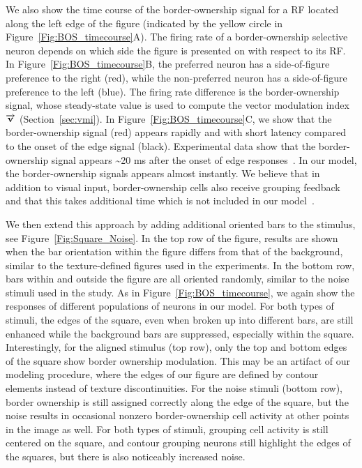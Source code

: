 We also show the time course of the border-ownership signal for a RF
located along the left edge of the figure (indicated by the yellow
circle in Figure~\ref{Fig:BOS_timecourse}A). The firing rate of a
border-ownership selective neuron depends on which side the figure is
presented on with respect to its RF. In
Figure~\ref{Fig:BOS_timecourse}B, the preferred neuron has a
side-of-figure preference to the right (red), while the non-preferred
neuron has a side-of-figure preference to the left (blue). The firing
rate difference is the border-ownership signal, whose steady-state
value is used to compute the vector modulation index 
$\overrightarrow{\mathbf{v}}$ 
(Section~\ref{sec:vmi}). In Figure~\ref{Fig:BOS_timecourse}C, we show
that the border-ownership signal (red) appears rapidly and with short
latency compared to the onset of the edge signal (black).
Experimental data show that the border-ownership signal appears 
\textasciitilde 20 ms after the onset of edge
responses~\citep{Zhou_etal00}. In our model, the
border-ownership signals appears almost instantly. We believe that in
addition to visual input, border-ownership cells also receive grouping
feedback and that this takes additional time which is not included in
our model~\citep[see][as an example of a model with
latencies]{Craft_etal07}.  

We then extend this approach by adding additional oriented bars to the
stimulus, see Figure~\ref{Fig:Square_Noise}. In the top row of the figure, results are shown when the bar
orientation within the figure differs from that of the background, 
similar to the texture-defined figures used in the
\citet{Lamme95} experiments. In the bottom row, bars within and outside the figure are all oriented
randomly, similar to the
noise stimuli used in the \citet{Chen_etal14} study.  As in
Figure~\ref{Fig:BOS_timecourse}, we again show the responses of
different populations of neurons in our model.  For both types of
stimuli, the edges of the square, even when broken up into different
bars, are still enhanced while the background bars are suppressed,
especially within the square.  Interestingly, for the aligned stimulus
(top row), only the top and bottom edges of the square show border
ownership modulation. 
This may be an artifact of our modeling
procedure, 
where the edges of our figure are defined by contour elements instead
of texture discontinuities.
For the noise stimuli (bottom row), border ownership is
still assigned correctly along the edge of the square, but the noise
results in occasional nonzero border-ownership cell activity at other
points in the image as well.  For both types of stimuli, grouping cell
activity is still centered on the square, and contour grouping neurons
still highlight the edges of the squares, but there is also noticeably
increased noise.

